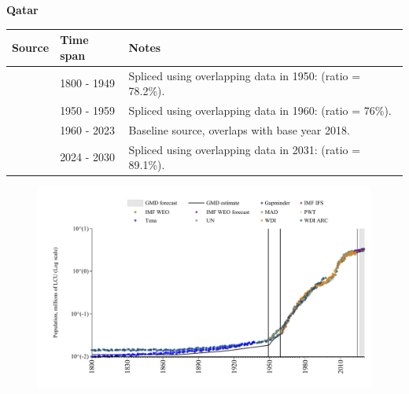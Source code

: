 \documentclass[12pt,a4paper,landscape]{article}
\begin{document}
\begin{adjustbox}{max totalsize={\paperwidth}{\paperheight},center}
\begin{minipage}[t][\textheight][t]{\textwidth}
\vspace*{0.5cm}
{}
\begin{center}
{\Large\bfseries Qatar}
\end{center}
\vspace{0.5cm}
\begin{table}[H]
\centering
\small
\begin{tabular}{|l|l|l|}
\hline
\textbf{Source} & \textbf{Time span} & \textbf{Notes} \\
\hline
\rowcolor{white}\cite{Gapminder}& 1800 - 1949 &Spliced using overlapping data in 1950: (ratio = 78.2\%).\\
\rowcolor{lightgray}\cite{IMF_IFS}& 1950 - 1959 &Spliced using overlapping data in 1960: (ratio = 76\%).\\
\rowcolor{white}\cite{WDI}& 1960 - 2023 &Baseline source, overlaps with base year 2018.\\
\rowcolor{lightgray}\cite{Gapminder}& 2024 - 2030 &Spliced using overlapping data in 2031: (ratio = 89.1\%).\\
\hline
\end{tabular}
\end{table}
\begin{figure}[H]
\centering
\includegraphics[width=\textwidth,height=0.6\textheight,keepaspectratio]{graphs/QAT_pop.pdf}
\end{figure}
\end{minipage}
\end{adjustbox}
\end{document}
